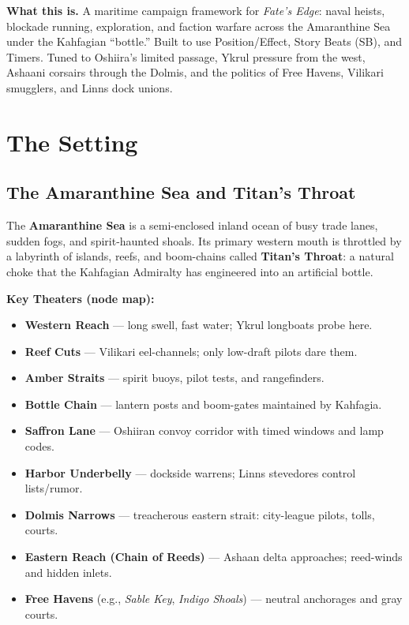 \documentclass[11pt,oneside]{book}
\begin{document}



\begin{tcolorbox}[breakable]
\textbf{What this is.} A maritime campaign framework for \textit{Fate's Edge}: naval heists, blockade running, exploration, and faction warfare across the Amaranthine Sea under the Kahfagian ``bottle.'' Built to use Position/Effect, Story Beats (SB), and Timers. Tuned to Oshiira's limited passage, Ykrul pressure from the west, Ashaani corsairs through the Dolmis, and the politics of Free Havens, Vilikari smugglers, and Linns dock unions.
\end{tcolorbox}

\tableofcontents


\chapter{The Setting}

\section{The Amaranthine Sea and Titan's Throat}
The \textbf{Amaranthine Sea} is a semi-enclosed inland ocean of busy trade lanes, sudden fogs, and spirit-haunted shoals. Its primary western mouth is throttled by a labyrinth of islands, reefs, and boom-chains called \textbf{Titan's Throat}: a natural choke that the Kahfagian Admiralty has engineered into an artificial bottle.

\medskip
\noindent\textbf{Key Theaters (node map):}
\begin{itemize}
  \item \textbf{Western Reach} --- long swell, fast water; Ykrul longboats probe here.
  \item \textbf{Reef Cuts} --- Vilikari eel-channels; only low-draft pilots dare them.
  \item \textbf{Amber Straits} --- spirit buoys, pilot tests, and rangefinders.
  \item \textbf{Bottle Chain} --- lantern posts and boom-gates maintained by Kahfagia.
  \item \textbf{Saffron Lane} --- Oshiiran convoy corridor with timed windows and lamp codes.
  \item \textbf{Harbor Underbelly} --- dockside warrens; Linns stevedores control lists/rumor.
  \item \textbf{Dolmis Narrows} --- treacherous eastern strait: city-league pilots, tolls, courts.
  \item \textbf{Eastern Reach (Chain of Reeds)} --- Ashaan delta approaches; reed-winds and hidden inlets.
  \item \textbf{Free Havens} (e.g., \textit{Sable Key}, \textit{Indigo Shoals}) --- neutral anchorages and gray courts.
\end{itemize}
\end{document}

